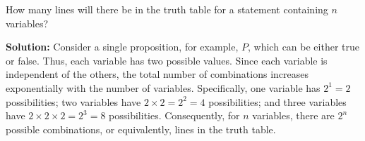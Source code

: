 How many lines will there be in the truth table for a statement containing \(n\) variables?

\textbf{Solution:} Consider a single proposition, for example, \(P\), which can be either true or false. Thus, each variable has two possible values. Since each variable is independent of the others, the total number of combinations increases exponentially with the number of variables. Specifically, one variable has \(2^1 = 2\) possibilities; two variables have \(2 \times 2 = 2^2 = 4\) possibilities; and three variables have \(2 \times 2 \times 2 = 2^3 = 8\) possibilities. Consequently, for \(n\) variables, there are \(2^n\) possible combinations, or equivalently, lines in the truth table.

\pagebreak